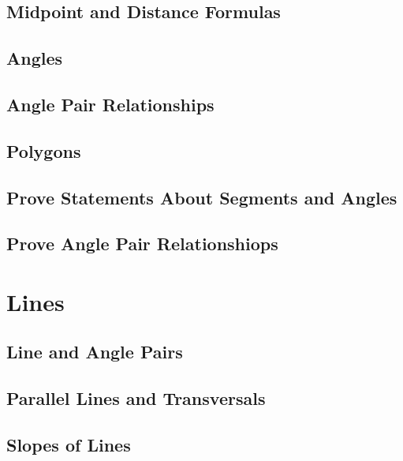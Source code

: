 \documentclass[]{book}
\begin{document}
\section{Midpoint and Distance
Formulas}\label{midpoint-and-distance-formulas}

\section{Angles}\label{angles}

\section{Angle Pair Relationships}\label{angle-pair-relationships}

\section{Polygons}\label{polygons}

\section{Prove Statements About Segments and
Angles}\label{prove-statements-about-segments-and-angles}

\section{Prove Angle Pair
Relationshiops}\label{prove-angle-pair-relationshiops}

\chapter{Lines}\label{lines}

\section{Line and Angle Pairs}\label{line-and-angle-pairs}

\section{Parallel Lines and
Transversals}\label{parallel-lines-and-transversals}

\section{Slopes of Lines}\label{slopes-of-lines}
\end{document}

